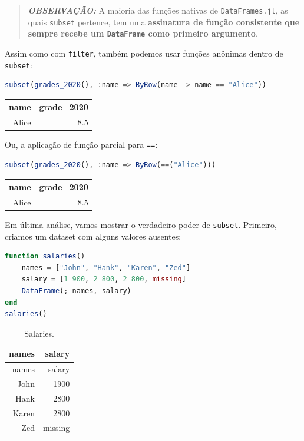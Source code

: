 \documentclass[
  notoc %
]{tufte-book}
\newcommand{\passthrough}[1]{#1}
\begin{document}
\begin{quote}
\textbf{\emph{OBSERVAÇÃO:}} A maioria das funções nativas de
\passthrough{\lstinline!DataFrames.jl!}, as quais
\passthrough{\lstinline!subset!} pertence, tem uma \textbf{assinatura de
função consistente que sempre recebe um
\passthrough{\lstinline!DataFrame!} como primeiro argumento}.
\end{quote}

Assim como com \passthrough{\lstinline!filter!}, também podemos usar
funções anônimas dentro de \passthrough{\lstinline!subset!}:

\begin{lstlisting}[language=Julia]
subset(grades_2020(), :name => ByRow(name -> name == "Alice"))
\end{lstlisting}

\begin{longtable}[]{@{}rr@{}}
\toprule
name & grade\_2020 \\
\midrule
\endhead
Alice & 8.5 \\
\bottomrule
\end{longtable}

Ou, a aplicação de função parcial para \passthrough{\lstinline!==!}:

\begin{lstlisting}[language=Julia]
subset(grades_2020(), :name => ByRow(==("Alice")))
\end{lstlisting}

\begin{longtable}[]{@{}rr@{}}
\toprule
name & grade\_2020 \\
\midrule
\endhead
Alice & 8.5 \\
\bottomrule
\end{longtable}

Em última análise, vamos mostrar o verdadeiro poder de
\passthrough{\lstinline!subset!}. Primeiro, criamos um dataset com
alguns valores ausentes:

\begin{lstlisting}[language=Julia]
function salaries()
    names = ["John", "Hank", "Karen", "Zed"]
    salary = [1_900, 2_800, 2_800, missing]
    DataFrame(; names, salary)
end
salaries()
\end{lstlisting}

\hypertarget{tbl:salaries}{}
\begin{longtable}[]{@{}rr@{}}
\caption{\label{tbl:salaries}Salaries.}\tabularnewline
\toprule
names & salary \\
\midrule
\endfirsthead
\toprule
names & salary \\
\midrule
\endhead
John & 1900 \\
Hank & 2800 \\
Karen & 2800 \\
Zed & missing \\
\bottomrule
\end{longtable}
\end{document}
